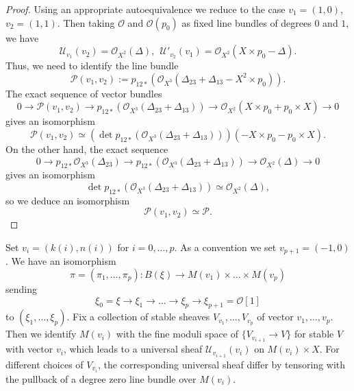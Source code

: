 \documentclass[reqno]{amsart}
\theoremstyle{definition}
\theoremstyle{remark}
\newcommand{\OO}{{\mathcal O}}
\newcommand{\PP}{{\mathcal P}}
\newcommand{\De}{\Delta}
\newcommand{\cU}{\mathcal{U}}
\newcommand{\cO}{\mathcal{O}}
\newcommand{\am}{\overrightarrow{m}}
\newcommand{\amu}{\overrightarrow{\mu}}
\numberwithin{equation}{section}
\begin{document}
\begin{proof} 
Using an appropriate autoequivalence we reduce to the case $v_1=(1,0)$, $v_2=(1,1)$.
Then taking $\OO$ and $\OO(p_0)$ as fixed line bundles of degrees $0$ and $1$, we have 
$$\cU_{v_1}(v_2)=\OO_{X^2}(\De), \ \ \cU'_{v_2}(v_1)=\OO_{X^2}(X\times p_0-\De).$$
Thus, we need to identify the line bundle
$$\PP(v_1,v_2):=p_{12*}(\OO_{X^3}(\De_{23}+\De_{13}-X^2\times p_0)).$$
The exact sequence of vector bundles 
$$0\to \PP(v_1,v_2)\to p_{12*}(\OO_{X^3}(\De_{23}+\De_{13}))\to \OO_{X^2}(X\times p_0+p_0\times X)\to 0$$
gives an isomorphism
$$\PP(v_1,v_2)\simeq (\det p_{12*}(\OO_{X^3}(\De_{23}+\De_{13})))(-X\times p_0-p_0\times X).$$
On the other hand, the exact sequence
$$0\to p_{12*}\OO_{X^3}(\De_{23})\to p_{12*}(\OO_{X^3}(\De_{23}+\De_{13}))\to \OO_{X^2}(\De)\to 0$$
gives an isomorphism
$$\det p_{12*}(\OO_{X^3}(\De_{23}+\De_{13}))\simeq \OO_{X^2}(\De),$$
so we deduce an isomorphism
$$\PP(v_1,v_2)\simeq \PP.$$
\end{proof}

Set $v_i=(k(i),n(i))$ for $i=0,\ldots,p$. As a convention we set $v_{p+1}=(-1,0)$. 
We have an isomorphism
\[
\pi=(\pi_1,\ldots,\pi_p): B(\xi)\to M(v_{1})\times\ldots \times M(v_p)
\] sending 
\[
\xi_0=\xi\to \xi_1\to\ldots \to \xi_p\to\xi_{p+1}=\cO[1]
\] to $(\xi_1,\ldots,\xi_p)$. Fix a collection of stable sheaves $V_{v_1},\ldots,V_{v_p}$ of vector $v_1,\ldots,v_p$. Then we identify $M(v_i)$ with the fine moduli space of $\{V_{v_{i+1}}\to V\}$ for stable $V$ with vector $v_i$, which leads to a universal sheaf $\cU_{v_{i+1}}(v_i)$ on $M(v_i)\times X$. For different choices of $V_{v_i}$, the corresponding universal sheaf differ by tensoring with the pullback of a degree zero line bundle over $M(v_i)$. 
\end{document}
